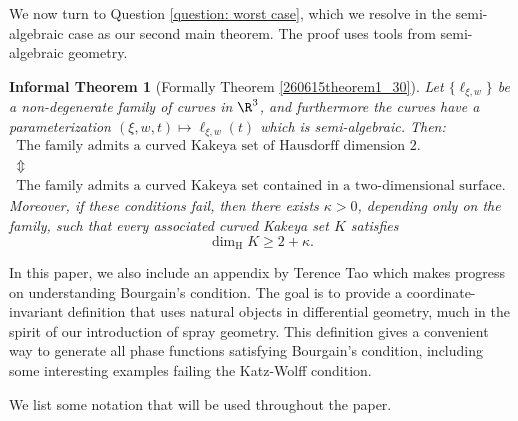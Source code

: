 \documentclass{article}
\numberwithin{equation}{section}
\theoremstyle{plain}
\newtheorem{informaltheorem}[theorem]{Informal Theorem}
\begin{document}
We now turn to Question \ref{question: worst case}, which we resolve in the semi-algebraic case as our second main theorem. The proof uses tools from semi-algebraic geometry. 
\begin{informaltheorem}[Formally Theorem \ref{260615theorem1_30}]
    Let $\{\ell_{\xi,w}\}$ be a non-degenerate family of curves in $\R^3$, and furthermore the curves have a parameterization $(\xi,w,t) \mapsto \ell_{\xi,w}(t)$ which is semi-algebraic. Then:
    \[
\begin{array}{c}
\text{The family admits a curved Kakeya set of Hausdorff dimension $2$.}
\\[0.5em]
\Updownarrow
\\[0.5em]
\text{The family admits a curved Kakeya set contained in a two-dimensional surface.}
\end{array}
\]
    Moreover, if these conditions fail, then there exists $\kappa>0$, depending only on the family, such that every associated curved Kakeya set
$K$ satisfies
\[
    \dim_{\mathrm H} K\geq 2+\kappa.
\]
\end{informaltheorem}


In this paper, we also include an appendix by Terence Tao which makes progress on understanding Bourgain's condition. The goal is to provide a coordinate-invariant definition that uses natural objects in differential geometry, much in the spirit of our introduction of spray geometry. This definition gives a convenient way to generate all phase functions satisfying Bourgain's condition, including some interesting examples failing the Katz-Wolff condition.

\bigskip 

 We list some notation that will be used throughout the paper. 
\end{document}
